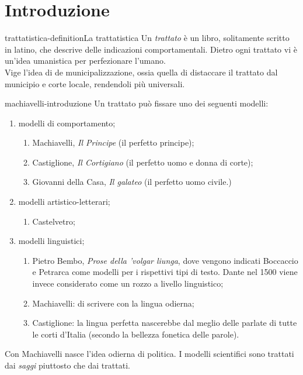 \documentclass[preview]{standalone}
\begin{document}
\genpage

\section{Introduzione}

\begin{snippetdefinition}{trattatistica-definition}{La trattatistica}
    Un \textit{trattato} è un libro, solitamente scritto in latino,
    che descrive delle indicazioni comportamentali.
    Dietro ogni trattato vi è un'idea umanistica per perfezionare l'umano. \\
    Vige l'idea di de municipalizzazione, ossia quella di distaccare
    il trattato dal municipio e corte locale, rendendoli più universali.
\end{snippetdefinition}

\begin{snippet}{machiavelli-introduzione}
    Un trattato può fissare uno dei seguenti modelli:
    \begin{enumerate}
        \item modelli di comportamento;
        \begin{enumerate}
            \item Machiavelli, \textit{Il Principe} (il perfetto principe);
            \item Castiglione, \textit{Il Cortigiano} (il perfetto uomo e donna di corte);
            \item Giovanni della Casa, \textit{Il galateo} (il perfetto uomo civile.)
        \end{enumerate}
        \item modelli artistico-letterari;
        \begin{enumerate}
            \item Castelvetro;
        \end{enumerate}
        \item modelli linguistici;
        \begin{enumerate}
            \item Pietro Bembo, \textit{Prose della 'volgar liunga},
                dove vengono indicati Boccaccio e Petrarca come modelli per i rispettivi tipi di testo.
                Dante nel 1500 viene invece considerato come un rozzo a livello linguistico;
            \item Machiavelli: di scrivere con la lingua odierna;
            \item Castiglione: la lingua perfetta nascerebbe dal
                meglio delle parlate di tutte le corti d'Italia (secondo la bellezza fonetica delle parole).
        \end{enumerate}
    \end{enumerate}
    
    Con Machiavelli nasce l'idea odierna di politica.
    I modelli scientifici sono trattati dai \textit{saggi} piuttosto che dai trattati.
\end{snippet}
\end{document}
